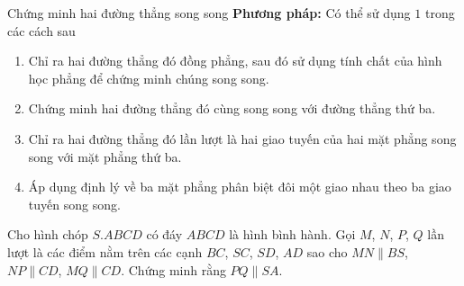 \begin{dang}{Chứng minh hai đường thẳng song song}
{\bf Phương pháp:} Có thể sử dụng $1$ trong các cách sau
\begin{enumerate}[{\bf Cách 1.}]
\item Chỉ ra hai đường thẳng đó đồng phẳng, sau đó sử dụng tính chất của hình học phẳng để chứng minh chúng song song.
\item Chứng minh hai đường thẳng đó cùng song song với đường thẳng thứ ba.
\item Chỉ ra hai đường thẳng đó lần lượt là hai giao tuyến của hai mặt phẳng song song với mặt phẳng thứ ba.
\item Áp dụng định lý về ba mặt phẳng phân biệt đôi một giao nhau theo ba giao tuyến song song.
\end{enumerate}
\end{dang}
\begin{vd}%
Cho hình chóp $S.ABCD$ có đáy $ABCD$ là hình bình hành. Gọi $M$, $N$, $P$, $Q$ lần lượt là các điểm nằm trên các cạnh $BC$, $SC$, $SD$, $AD$ sao cho $MN\parallel BS$, $NP\parallel CD$, $MQ\parallel CD$. Chứng minh rằng $PQ\parallel SA$.
\end{vd}

